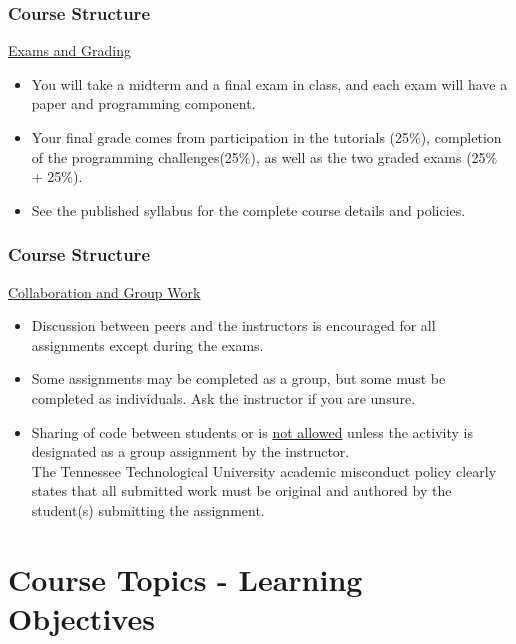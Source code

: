 \documentclass[fleqn]{beamer} %
\newcommand{\sectiontitleI}{Course Structure} %
\newcommand{\sectiontitleII}{Course Topics - Learning Objectives}
\begin{document}
	\begin{frame} \small
		\frametitle{\sectiontitleI}
		\underline{\large Exams and Grading}	
		\begin{itemize}
			\item You will take a midterm and a final exam in class, and each exam will have a paper and programming component.
			
			\item Your final grade comes from participation in the tutorials (25\%), completion of the programming challenges(25\%), as well as the two graded exams (25\% + 25\%).     
			
			\item See the published syllabus for the complete course details and policies. 
			
		\end{itemize}	
	\end{frame}

	\begin{frame} \small
		\frametitle{\sectiontitleI}
		\underline{\large Collaboration and Group Work}	
		\begin{itemize}
			\item Discussion between peers and the instructors is encouraged for all assignments except during the exams.
			
			\item Some assignments may be completed as a group, but some must be completed as individuals. Ask the instructor if you are unsure. 
			
			\item {\BL Sharing of code between students or is \underline{not allowed} unless the activity is designated as a group assignment by the instructor. \vspace{2mm} \\ The Tennessee Technological University academic misconduct policy clearly states that all submitted work must be original and authored by the student(s) submitting the assignment.} 		
		\end{itemize}	
	\end{frame}



\section{\sectiontitleII}
\end{document}

